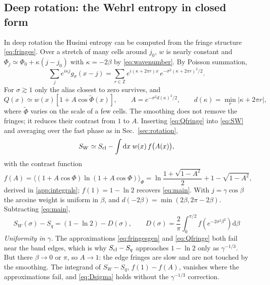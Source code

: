 \documentclass[preprint,12pt]{elsarticle}
\newcommand{\dd}{\mathrm{d}}
\newcommand{\Scl}{S_{\rm cl}}
\newcommand{\SW}{S_{W}}
\begin{document}
\subsection{Deep rotation: the Wehrl entropy in closed form}

In deep rotation the Husimi entropy can be computed from the fringe structure
\eqref{eq:fringes}. Over a stretch of many cells around $j_{0}$, $w$ is nearly
constant and $\Phi_{j}\simeq\Phi_{0}+\kappa(j-j_{0})$ with $\kappa=-2\beta$ by
\eqref{eq:wavenumber}. By Poisson summation,
\begin{equation}
\sum_{j}e^{i\kappa j}g_{\sigma}(x-j)=\sum_{r\in\mathbb{Z}}
e^{i(\kappa+2\pi r)x}\,e^{-\sigma^{2}(\kappa+2\pi r)^{2}/2}.
\end{equation}
For $\sigma\gtrsim1$ only the alias closest to zero survives, and
\begin{equation}
Q(x)\simeq w(x)\left[1+A\cos\tilde\Phi(x)\right],\qquad
A=e^{-\sigma^{2}d(\kappa)^{2}/2},\qquad d(\kappa)=\min_{r}|\kappa+2\pi r|,
\label{eq:Qfringe}
\end{equation}
where $\tilde\Phi$ varies on the scale of a few cells. The smoothing does not
remove the fringes; it reduces their contrast from $1$ to $A$. Inserting
\eqref{eq:Qfringe} into \eqref{eq:SW} and averaging over the fast phase as in
Sec.~\ref{sec:rotation},
\begin{equation}
\SW\simeq\Scl-\int\dd x\;w(x)\,f\big(A(x)\big),
\label{eq:SWfringe}
\end{equation}
with the contrast function
\begin{equation}
f(A)=\big\langle(1+A\cos\Phi)\ln(1+A\cos\Phi)\big\rangle_{\Phi}
=\ln\frac{1+\sqrt{1-A^{2}}}{2}+1-\sqrt{1-A^{2}},
\label{eq:fA}
\end{equation}
derived in \ref{app:integrals}; $f(1)=1-\ln2$ recovers \eqref{eq:main}. With
$j=\gamma\cos\beta$ the arcsine weight is uniform in $\beta$, and
$d(-2\beta)=\min(2\beta,2\pi-2\beta)$. Subtracting \eqref{eq:main},
\begin{equation}
\boxed{\;\SW(\sigma)-S_{q}=\left(1-\ln2\right)-D(\sigma),\qquad
D(\sigma)=\frac{2}{\pi}\int_{0}^{\pi/2}f\!\left(e^{-2\sigma^{2}\beta^{2}}\right)
\dd\beta\;}
\label{eq:Dsigma}
\end{equation}
\emph{Uniformity in $\gamma$.} The approximations \eqref{eq:fringesgen} and
\eqref{eq:Qfringe} both fail near the band edges, which is why $\Scl-S_{q}$
approaches $1-\ln2$ only as $\gamma^{-1/3}$. But there $\beta\to0$ or $\pi$, so
$A\to1$: the edge fringes are slow and are not touched by the smoothing. The
integrand of $\SW-S_{q}$, $f(1)-f(A)$, vanishes where the approximations fail,
and \eqref{eq:Dsigma} holds without the $\gamma^{-1/3}$ correction.
\end{document}

